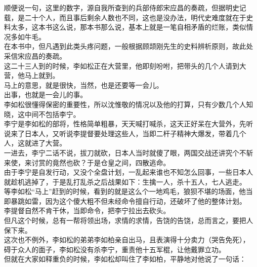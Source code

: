 \begin{multicols}{\theparacolNo}
顺便说一句，这里的数字，源自我所查到的兵部侍郎宋应昌的奏疏，但据明史记载，是二十个人，而且事后剩余人数也不同，这也是没办法，明代史难度就在于史料太多，这本书这么说，那本书那么说，基本上就是一笔自相矛盾的烂账，类似情况多如牛毛。\\

在本书中，但凡遇到此类头疼问题，一般根据顾颉刚先生的史料辨析原则，故此处采信宋应昌的奏疏。\\

这二十三人到的时候，李如松正在大营里，他即刻吩咐，把带头的几个人请到大营，他马上就到。\\

马上的意思，就是很快，当然，也是还要等一会儿。\\

出事，也就是一会儿的事。\\

李如松很懂得保密的重要性，所以沈惟敬的情况以及他的打算，只有少数几个人知晓，这中间不包括李宁。\\

李宁是李如松的部将，性格简单粗暴，天天喊打喊杀，这天正好呆在大营外，先听说来了日本人，又听说李提督要处理这些人，当即二杆子精神大爆发，带着几个人，这就进了大营。\\

一进去，李宁二话不说，拔刀就砍，日本人当时就傻了眼，两国交战还讲究个不斩来使，来讨赏的竟然也砍？于是仓皇之间，四散逃命。\\

由于李宁是自发行动，又没个全盘计划，一乱起来谁也不知怎么回事，一些日本人就趁机逃掉了，于是乱打乱杀之后战果如下：生擒一人，杀十五人，七人逃走。\\

等李如松“马上”赶到的时候，看到的就是这么个一地鸡毛，狼狈不堪的场面，他当即暴跳如雷，因为这个傻大粗不但未经命令擅自行动，还破坏了他的整体计划。\\

李提督自然不肯干休，当即命令，把李宁拉出去砍头。\\

但凡这个时候，总有一帮将领出场，求情的求情，告饶的告饶，总而言之，要把人保下来。\\

这次也不例外，李如松的弟弟李如柏亲自出马，且表演得十分卖力（哭告免死），碍于众人的面子，李如松没有杀李宁，重责他十五军棍，让他戴罪立功。\\

但就在大家如释重负的时候，李如松却叫住了李如柏，平静地对他说了一句话：\\


\end{multicols}
